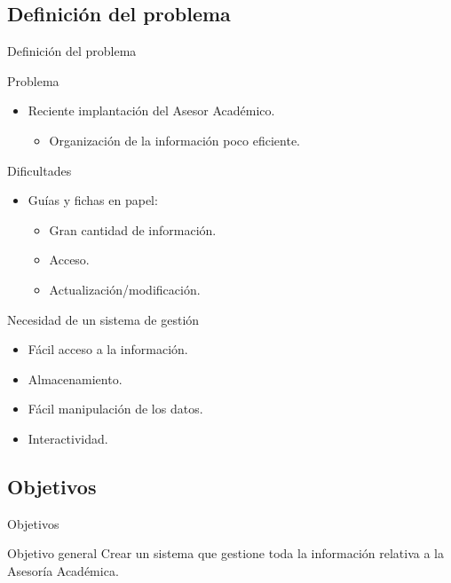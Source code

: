 \documentclass[10pt, hyperref={pdfpagelabels=false}]{beamer}
\begin{document}
    \subsection{Definición del problema}
      \begin{frame}{Definición del problema}
        \begin{block}{Problema}
          \begin{itemize}
           \item Reciente implantación del Asesor Académico.
           \begin{itemize}
            \item Organización de la información poco eficiente.
           \end{itemize}
          \end{itemize}
         \end{block}
         \begin{block}{Dificultades}
          \begin{itemize}
           \item Guías y fichas en papel:
           \begin{itemize}
            \item Gran cantidad de información.
            \item Acceso.
            \item Actualización/modificación.
           \end{itemize}
          \end{itemize}
        \end{block}
      \end{frame}

      \begin{frame}
        \begin{block}{Necesidad de un sistema de gestión}
          \begin{itemize}
           \item Fácil acceso a la información.
           \item Almacenamiento.
           \item Fácil manipulación de los datos.
           \item Interactividad.
          \end{itemize}
        \end{block}
      \end{frame}


    \subsection{Objetivos}
      \begin{frame}{Objetivos}
        \begin{block}{Objetivo general}
        Crear un sistema que gestione toda la información relativa a la Asesoría
        Académica.
        \end{block}
      \end{frame}
\end{document}
